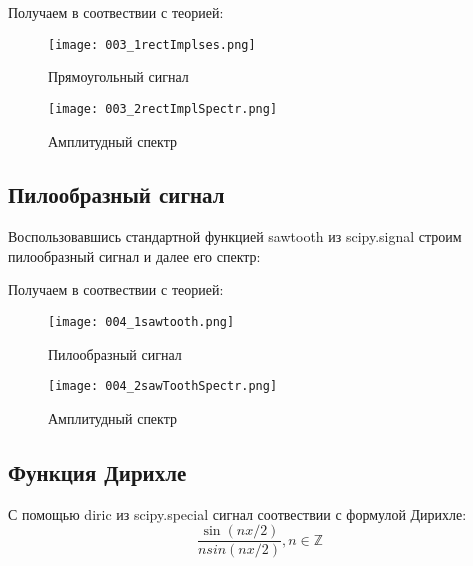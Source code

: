 Получаем в соотвествии с теорией:
\begin{figure}[H]
	\begin{center}
		\texttt{[image: 003\_1rectImplses.png]}
		\caption{Прямоугольный сигнал} 
		\label{pic:pic05} %
	\end{center}
\end{figure} 

\begin{figure}[H]
	\begin{center}
		\texttt{[image: 003\_2rectImplSpectr.png]}
		\caption{Амплитудный спектр} 
		\label{pic:pic06} %
	\end{center}
\end{figure} 

\subsection{Пилообразный сигнал}
Воспользовавшись стандартной функцией  sawtooth из scipy.signal строим пилообразный сигнал и далее его  спектр:

\parindent=1cm %

Получаем в соотвествии с теорией:
\begin{figure}[H]
	\begin{center}
		\texttt{[image: 004\_1sawtooth.png]}
		\caption{Пилообразный сигнал} 
		\label{pic:pic07} %
	\end{center}
\end{figure} 

\begin{figure}[H]
	\begin{center}
		\texttt{[image: 004\_2sawToothSpectr.png]}
		\caption{Амплитудный спектр} 
		\label{pic:pic08} %
	\end{center}
\end{figure} 


\subsection{Функция Дирихле}
С помощью diric из scipy.special сигнал соотвествии с формулой Дирихле:
$$	\frac{\sin(nx/2)}{nsin(nx/2)}, n \in \mathbb Z $$ 			

